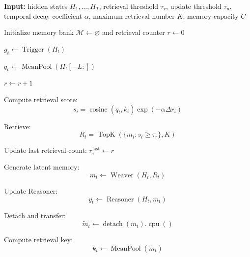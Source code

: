 \documentclass[letterpaper]{article}
\begin{document}
\begin{algorithm}[t]
\caption{Inference procedure of the latent memory manager}
\label{alg:latent-memory}
\begin{algorithmic}[1]

\STATE \textbf{Input:} hidden states \(H_1,\ldots,H_T\), retrieval
threshold \(\tau_r\), update threshold \(\tau_u\), temporal decay
coefficient \(\alpha\), maximum retrieval number \(K\), memory capacity
\(C\)

\STATE Initialize memory bank
\(\mathcal{M}\leftarrow\varnothing\)
and retrieval counter \(r\leftarrow0\)


    \STATE \(g_t\leftarrow\operatorname{Trigger}(H_t)\)


        \STATE
        \(q_t\leftarrow\operatorname{MeanPool}(H_t[-L:])\)

        \STATE
        \(r\leftarrow r+1\)


            \STATE Compute retrieval score:
            \[
            s_i=
            \operatorname{cosine}(q_t,k_i)
            \exp(-\alpha\Delta r_i)
            \]

        \ENDFOR


        \STATE Retrieve:
        \[
        R_t=
        \operatorname{TopK}
        (\{m_i:s_i\geq\tau_r\},K)
        \]



            \STATE Update last retrieval count:
            \(r_i^{\mathrm{last}}\leftarrow r\)

        \ENDFOR


        \STATE Generate latent memory:
        \[
        m_t\leftarrow
        \operatorname{Weaver}(H_t,R_t)
        \]


        \STATE Update Reasoner:
        \[
        y_t\leftarrow
        \operatorname{Reasoner}(H_t,m_t)
        \]


        \STATE Detach and transfer:
        \[
        \widetilde{m}_t
        \leftarrow
        \operatorname{detach}(m_t).\operatorname{cpu}()
        \]


        \STATE Compute retrieval key:
        \[
        k_t
        \leftarrow
        \operatorname{MeanPool}(\widetilde{m}_t)
        \]




\end{algorithmic}
\end{algorithm}
\end{document}
